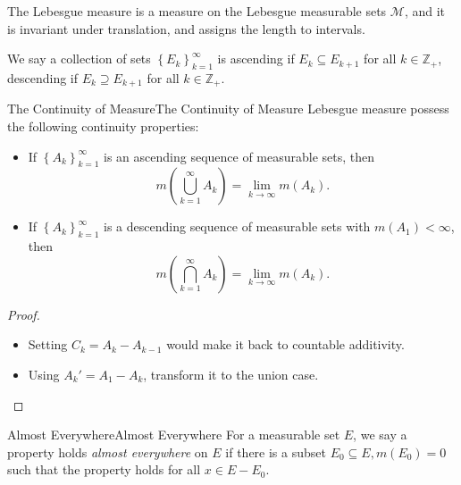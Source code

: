\documentclass[../main.tex]{subfiles}
\begin{document}
\begin{remark}
	The Lebesgue measure is a measure on the Lebesgue measurable sets $\mathcal{M}$, and it is invariant under translation, and assigns the length to intervals. 
\end{remark}

We say a collection of sets $\left\{ E_k \right\}_{k=1}^{\infty }$ is ascending if $E_k \subseteq E_{k+1}$ for all $k\in \mathbb{Z}_+$, descending if $E_k \supseteq E_{k+1}$ for all $k\in \mathbb{Z}_+$.

\begin{theorem}{The Continuity of Measure}{The Continuity of Measure}
	Lebesgue measure possess the following continuity properties:
	\begin{itemize}
	\item If $\left\{ A_k \right\}_{k=1}^{\infty }$ is an ascending sequence of measurable sets, then
		\begin{equation*}
			m \left(\bigcup_{k=1}^{\infty } A_k\right) = \lim_{k \to \infty } m(A_k).
		\end{equation*}
	\item If $\left\{ A_k \right\}_{k=1}^{\infty }$ is a descending sequence of measurable sets with $m(A_1) < \infty $, then
		\begin{equation*}
			m \left(\bigcap_{k=1}^{\infty } A_k\right) = \lim_{k \to \infty } m(A_k).
		\end{equation*}
	\end{itemize}
\end{theorem}
\begin{proof}
\begin{itemize}
\item Setting $C_k = A_k - A_{k-1}$ would make it back to countable additivity.
\item Using $A_k' = A_1-A_k$, transform it to the union case.
\end{itemize}
\end{proof}

\begin{theorem}{Almost Everywhere}{Almost Everywhere}
	For a measurable set $E$, we say a property holds \emph{almost everywhere} on $E$ if there is a subset $E_0 \subseteq E, m(E_0)=0$ such that the property holds for all $x\in E-E_0$.
\end{theorem}
\end{document}
